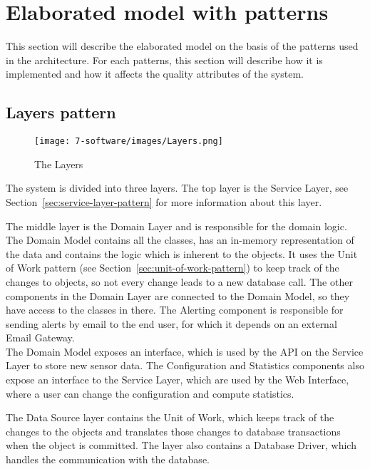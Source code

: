 
\clearpage
\section{Elaborated model with patterns}
This section will describe the elaborated model on the basis of the patterns used in the architecture. For each patterns, this section will describe how it is implemented and how it affects the quality attributes of the system.

\subsection{Layers pattern}
\begin{figure}[H]
\centering
\texttt{[image: 7-software/images/Layers.png]}
\caption{The Layers}
\label{fig:layers}
\end{figure}
The system is divided into three layers. The top layer is the Service Layer, see Section~\ref{sec:service-layer-pattern} for more information about this layer.

The middle layer is the Domain Layer and is responsible for the domain logic. The Domain Model contains all the classes, has an in-memory representation of the data and contains the logic which is inherent to the objects.
It uses the Unit of Work pattern (see Section~\ref{sec:unit-of-work-pattern}) to keep track of the changes to objects, so not every change leads to a new database call. 
The other components in the Domain Layer are connected to the Domain Model, so they have access to the classes in there. 
The Alerting component is responsible for sending alerts by email to the end user, for which it depends on an external Email Gateway.\\
The Domain Model exposes an interface, which is used by the API on the Service Layer to store new sensor data. The Configuration and Statistics components also expose an interface to the Service Layer, which are used by the Web Interface, where a user can change the configuration and compute statistics.

The Data Source layer contains the Unit of Work, which keeps track of the changes to the objects and translates those changes to database transactions when the object is committed. The layer also contains a Database Driver, which handles the communication with the database.




